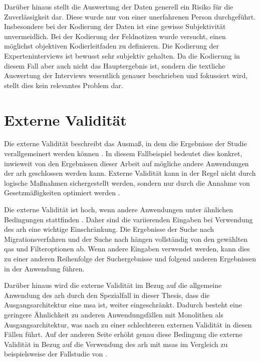 Darüber hinaus stellt die Auswertung der Daten generell ein Risiko für die Zuverlässigkeit dar. 
Diese wurde nur von einer unerfahrenen Person durchgeführt. 
Insbesondere bei der Kodierung der Daten ist eine gewisse Subjektivität unvermeidlich.
Bei der Kodierung der Feldnotizen wurde versucht, einen möglichst objektiven Kodierleitfaden zu definieren.
Die Kodierung der Experteninterviews ist bewusst sehr subjektiv gehalten.
Da die Kodierung in diesem Fall aber auch nicht das Hauptergebnis ist, sondern die textliche Auswertung der Interviews wesentlich genauer beschrieben und fokussiert wird, stellt dies kein relevantes Problem dar.

\section{Externe Validität}

Die externe Validität beschreibt das Ausmaß, in dem die Ergebnisse der Studie verallgemeinert werden können \cite{Runeson2009}. 
In diesem Fallbeispiel bedeutet dies konkret, inwieweit von den Ergebnissen dieser Arbeit auf mögliche andere Anwendungen der \gls{arh} geschlossen werden kann.
Externe Validität kann in der Regel nicht durch logische Maßnahmen sichergestellt werden, sondern nur durch die Annahme von Gesetzmäßigkeiten optimiert werden \cite{campbell2015experimental}.

Die externe Validität ist hoch, wenn andere Anwendungen unter ähnlichen Bedingungen statt\-fin\-den \cite{campbell2015experimental}.
Daher sind die variierenden Eingaben bei Verwendung des \gls{arh} eine wichtige Einschränkung.
Die Ergebnisse der Suche nach Migrationsverfahren und der Suche nach \bpp hängen vollständig von den gewählten \glspl{qa} und Filteroptionen ab.
Wenn andere Eingaben verwendet werden, kann dies zu einer anderen Reihenfolge der Suchergebnisse und folgend anderen Ergebnissen in der Anwendung führen.

Darüber hinaus wird die externe Validität im Bezug auf die allgemeine Anwendung des \gls{arh} durch den Spezialfall in dieser Thesis, dass die Ausgangsarchitektur eine \gls{msa} ist, weiter eingeschränkt.
Dadurch besteht eine geringere Ähnlichkeit zu anderen Anwendungsfällen mit Monolithen als Ausgangsarchitektur, was nach  zu einer schlechteren externen Validität in diesen Fällen führt.
Auf der anderen Seite erhöht genau diese Bedingung die externe Validität in Bezug auf die Verwendung des \gls{arh} mit \glspl{msa} im Vergleich zu beispielsweise der Fallstudie von .

